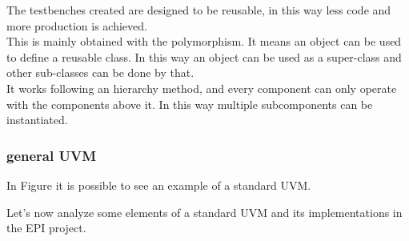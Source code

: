 The testbenches created are designed to be reusable, in this way less code and more production is achieved.\\

This is mainly obtained with the polymorphism. It means an object can be used to define a reusable class. In this way an object can be used as a super-class and other sub-classes can be done by that.\\

It works following an hierarchy method, and every component can only operate with the components above it. In this way multiple subcomponents can be instantiated.\\

\subsubsection{general UVM}
In Figure %
it is possible to see an example of a standard UVM.

Let's now analyze some elements of a standard UVM and its implementations in the EPI project.


